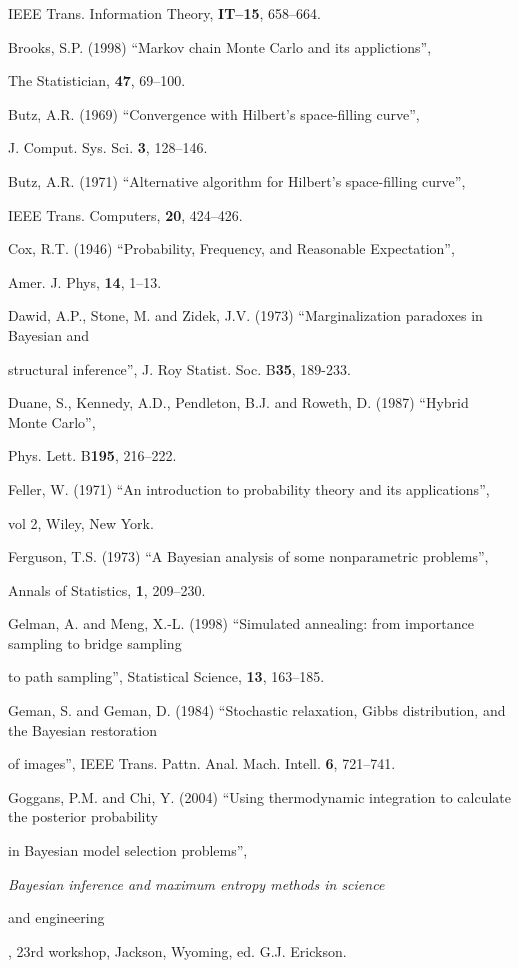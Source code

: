  IEEE Trans. Information Theory, {\bf IT--15}, 658--664.

\noindent Brooks, S.P. (1998) ``Markov chain Monte Carlo and its applictions'',

 The Statistician, {\bf 47}, 69--100.

\noindent Butz, A.R. (1969) ``Convergence with Hilbert's space-filling curve'',

 J. Comput. Sys. Sci. {\bf 3}, 128--146.

\noindent Butz, A.R. (1971) ``Alternative algorithm for Hilbert's space-filling curve'',

 IEEE Trans. Computers, {\bf 20}, 424--426.

\noindent Cox, R.T. (1946) ``Probability, Frequency, and Reasonable Expectation'',

 Amer. J. Phys, {\bf 14}, 1--13.

\noindent Dawid, A.P., Stone, M. and Zidek, J.V. (1973) ``Marginalization paradoxes in Bayesian and

 structural inference'', J. Roy Statist. Soc. B{\bf 35}, 189-233.

\noindent Duane, S., Kennedy, A.D., Pendleton, B.J. and Roweth, D. (1987) ``Hybrid Monte Carlo'',

 Phys. Lett. B{\bf 195}, 216--222.

\noindent Feller, W. (1971) ``An introduction to probability theory and its applications'',

 vol 2, Wiley, New York.

\noindent Ferguson, T.S. (1973) ``A Bayesian analysis of some nonparametric problems'',

 Annals of Statistics, {\bf 1}, 209--230.

\noindent Gelman, A. and Meng, X.-L. (1998) ``Simulated annealing: from importance sampling to bridge sampling

 to path sampling'', Statistical Science, {\bf 13}, 163--185.

\noindent Geman, S. and Geman, D. (1984) ``Stochastic relaxation, Gibbs distribution, and the Bayesian restoration

 of images'', IEEE Trans. Pattn. Anal. Mach. Intell. {\bf 6}, 721--741.

\noindent Goggans, P.M. and Chi, Y. (2004) ``Using thermodynamic integration to calculate the posterior probability

 in Bayesian model selection problems'', {\it Bayesian inference and maximum entropy methods in science

 and engineering}, 23rd workshop, Jackson, Wyoming, ed. G.J. Erickson.

